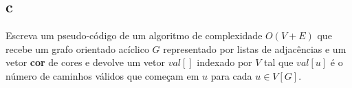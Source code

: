 \subsection{c} Escreva um pseudo-código de um algoritmo de complexidade $O(V +E)$ que recebe um grafo orientado acíclico $G$ representado por listas de adjacências e um vetor \textbf{cor} de cores e devolve um vetor $val[]$ indexado por $V$ tal que $val[u]$ é o número de caminhos válidos que começam em $u$ para cada $u \in V[G]$.
